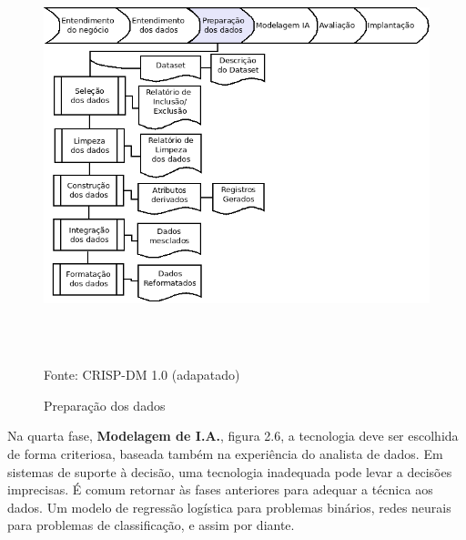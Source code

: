 \begin{figure}[!ht]
\centering
\caption{Preparação dos dados}
\vspace{1mm}
\includegraphics[width=160mm, height=120mm]{Figuras/Cronograma/PreparaDados.png}\\
\tiny Fonte: CRISP-DM 1.0 (adapatado)
\end{figure}

\pagebreak



Na quarta fase, \textbf{Modelagem de I.A.}, figura 2.6, a tecnologia deve ser escolhida de forma criteriosa, baseada também na experiência do analista de dados. 
Em sistemas de suporte à decisão, uma tecnologia inadequada pode levar a decisões imprecisas. É comum retornar às fases anteriores para adequar a técnica aos dados. 
Um modelo de regressão logística para problemas binários, redes neurais para problemas de classificação, e assim por diante.

\vspace{0.5cm}

